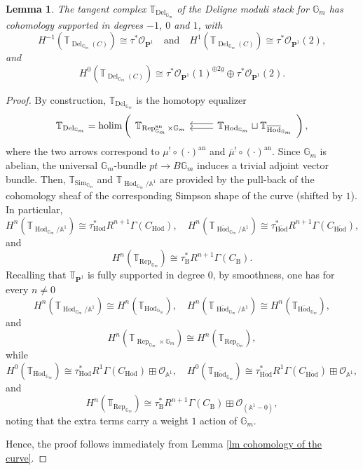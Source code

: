 \documentclass[10pt,a4paper]{amsart}
\newtheorem{lemma}{Lemma}
\renewcommand{\AA}{\mathbb{A}}
\newcommand{\B}{\mathrm{B}}
\DeclareMathOperator{\Del}{Del}
\DeclareMathOperator{\Deligne}{Del}
\newcommand{\GG}{\mathbb{G}}
\DeclareMathOperator{\Hod}{Hod}
\newcommand{\Oo}{\mathcal{O}}
\renewcommand{\P}{\mathbf{P}}
\DeclareMathOperator{\Rep}{Rep}
\DeclareMathOperator{\Sim}{Sim}
\newcommand{\TT}{\mathbb{T}}
\DeclareMathOperator{\an}{an}
\newcommand{\ol}[1]{\overline{#1}}
\renewcommand{\to}{\longrightarrow}
\begin{document}
\begin{lemma} \label{lm description of T_Del}
The tangent complex $\TT_{\Del_{\GG_m}}$ of the Deligne moduli stack for $\GG_m$ has cohomology supported in degrees $-1$, $0$ and $1$, with
\begin{equation} \label{eq description of T_Del}
H^{-1}(\TT_{\Deligne_{\GG_m}(C)}) \cong \tau^*\Oo_{\P^1} \quad \text{and} \quad H^{1}(\TT_{\Deligne_{\GG_m}(C)}) \cong \tau^*\Oo_{\P^1}(2),
\end{equation}
and
\[
H^{0}(\TT_{\Deligne_{\GG_m}(C)}) \cong \tau^*\Oo_{\P^1}(1)^{\oplus 2g} \oplus \tau^*\Oo_{\P^1}(2).
\]
\end{lemma}

\begin{proof}
By construction, $\TT_{\Deligne_{\GG_m}}$ is the homotopy equalizer
\[
\TT_{\Deligne_{\GG_m}} = \mathrm{holim} \left ( \begin{tikzcd}
	\TT_{\Rep^{\an}_{\GG_m} \times \GG_m}   &  \TT_{\Hod_{\GG_m}} \sqcup \TT_{\ol \Hod_{\GG_m}}
	\arrow[shift right, from=1-2, to=1-1]
	\arrow[shift left, from=1-2, to=1-1]
\end{tikzcd} \right ) ,
\]
where the two arrows correspond to $\mu^! \circ (\cdot)^{\an}$ and $\ol\mu^! \circ (\cdot)^{\an}$. Since $\GG_m$ is abelian, the universal $\GG_m$-bundle $pt \to B\GG_m$ induces a trivial adjoint vector bundle. Then, $\TT_{\Sim_{\GG_m}}$ and $\TT_{\Hod_{\GG_m}/\AA^1}$ are provided by the pull-back of the cohomology sheaf of the corresponding Simpson shape of the curve (shifted by $1$). In particular, 
\[
H^n(\TT_{\Hod_{\GG_m}/\AA^1}) \cong \tau_{\Hod}^* R^{n+1}\Gamma(C_{\Hod}), \quad H^n(\TT_{\ol\Hod_{\GG_m}/\AA^1}) \cong \tau_{\ol \Hod}^* R^{n+1}\Gamma(C_{\ol \Hod}),
\]
and
\[
H^n(\TT_{\Rep_{\GG_m}}) \cong \tau_{\B}^* R^{n+1}\Gamma(C_{\B}).
\]
Recalling that $\TT_{\P^1}$ is fully supported in degree $0$, by smoothness, one has for every $n \neq 0$
\[
H^n(\TT_{\Hod_{\GG_m}/\AA^1}) \cong H^n(\TT_{\Hod_{\GG_m}}), \quad H^n(\TT_{\ol\Hod_{\GG_m}/\AA^1}) \cong H^n(\TT_{\ol\Hod_{\GG_m}}), 
\] 
and 
\[
H^n(\TT_{\Rep_{\GG_m} \times \GG_m}) \cong H^n(\TT_{\Rep_{\GG_m}}),
\]
while
\[
H^0(\TT_{\Hod_{\GG_m}}) \cong \tau_{\Hod}^* R^{1}\Gamma(C_{\Hod}) \boxplus \Oo_{\AA^1}, \quad H^0(\TT_{\ol\Hod_{\GG_m}}) \cong \tau_{\ol \Hod}^* R^{1}\Gamma(C_{\ol \Hod}) \boxplus \Oo_{\AA^1},
\]
and
\[
H^n(\TT_{\Rep_{\GG_m}}) \cong \tau_{\B}^* R^{n+1}\Gamma(C_{\B}) \boxplus \Oo_{(\AA^1- 0)},
\]
noting that the extra terms carry a weight $1$ action of $\GG_m$.

Hence, the proof follows immediately from Lemma \ref{lm cohomology of the curve}.
\end{proof}
\end{document}
